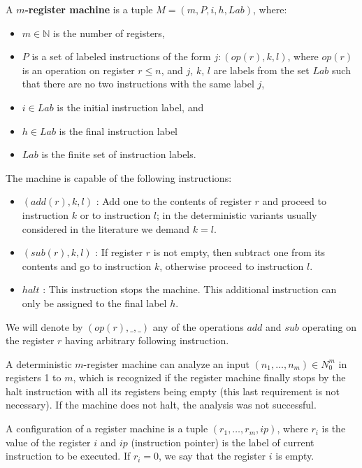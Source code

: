 \documentclass[submission,copyright,creativecommons]{../lib/lncs/llncs}
\begin{document}
\begin{definition}
  A {\bf $m$-register machine} is a tuple $M = (m,P,i,h,Lab)$, where:
  \begin{itemize}
    \item $m\in\mathbb N$ is the number of registers,
    \item $P$ is a set of labeled instructions of the form $j : (op(r),k,l)$, where $op(r)$ is an operation on register $r\leq n$, and $j$, $k$, $l$ are labels from the set $Lab$ such that there are no two instructions with the same label $j$,
    \item $i\in Lab$ is the initial instruction label, and
    \item $h\in Lab$ is the final instruction label
    \item $Lab$ is the finite set of instruction labels.
  \end{itemize}
\end{definition}

The machine is capable of the following instructions:
\begin{itemize}
  \item $(add(r),k,l)$ : Add one to the contents of register $r$ and proceed to instruction $k$ or to instruction $l$; in the deterministic variants usually considered in the literature we demand $k = l$.
  \item $(sub(r),k,l)$ : If register $r$ is not empty, then subtract one from its contents and go to instruction $k$, otherwise proceed to instruction $l$.
  \item $halt$ : This instruction stops the machine. This additional instruction can only be assigned to the final label $h$.
\end{itemize}

We will denote by $(op(r), \_, \_)$ any of the operations $add$ and $sub$ operating on the register $r$ having arbitrary following instruction. 

A deterministic $m$-register machine can analyze an input $(n_1,\dots,n_m)\in N_0^m$ in registers 1 to $m$, which is recognized if the register machine finally stops by the halt instruction with all its registers being empty (this last requirement is not necessary). If the machine does not halt, the analysis was not successful.

A configuration of a register machine is a tuple $(r_1, \ldots, r_m, ip)$, where $r_i$ is the value of the register $i$ and $ip$ (instruction pointer) is the label of current instruction to be executed. If $r_i=0$, we say that the register $i$ is empty.
\end{document}
